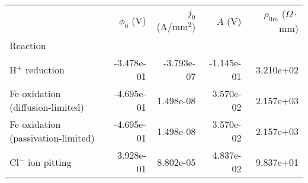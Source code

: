\begin{tabular}{lrrrr}
\toprule
{} &  $\phi_0$ (V) &  $j_0$ (A/mm$^2$) &    $A$ (V) &  $\rho_{\text{lim}}$ ($\Omega \cdot$mm) \\
Reaction                           &               &                   &            &                                         \\
\midrule
H$^+$ reduction                    &    -3.478e-01 &        -3.793e-07 & -1.145e-01 &                               3.210e+02 \\
Fe oxidation (diffusion-limited)   &    -4.695e-01 &         1.498e-08 &  3.570e-02 &                               2.157e+03 \\
Fe oxidation (passivation-limited) &    -4.695e-01 &         1.498e-08 &  3.570e-02 &                               2.157e+03 \\
Cl$^-$ ion pitting                 &     3.928e-01 &         8.802e-05 &  4.837e-02 &                               9.837e+01 \\
\bottomrule
\end{tabular}
